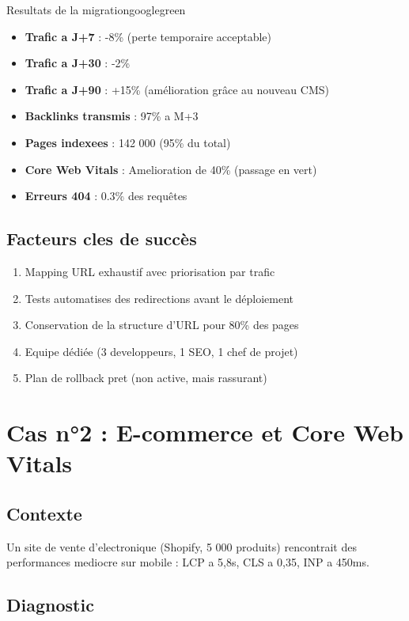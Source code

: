 \begin{mybox}{Resultats de la migration}{googlegreen}
\begin{itemize}
    \item \textbf{Trafic a J+7} : -8\% (perte temporaire acceptable)
    \item \textbf{Trafic a J+30} : -2\%
    \item \textbf{Trafic a J+90} : +15\% (amélioration grâce au nouveau CMS)
    \item \textbf{Backlinks transmis} : 97\% a M+3
    \item \textbf{Pages indexees} : 142 000 (95\% du total)
    \item \textbf{Core Web Vitals} : Amelioration de 40\% (passage en vert)
    \item \textbf{Erreurs 404} : 0.3\% des requêtes
\end{itemize}
\end{mybox}

\subsection{Facteurs cles de succès}

\begin{enumerate}
    \item Mapping URL exhaustif avec priorisation par trafic
    \item Tests automatises des redirections avant le déploiement
    \item Conservation de la structure d'URL pour 80\% des pages
    \item Equipe dédiée (3 developpeurs, 1 SEO, 1 chef de projet)
    \item Plan de rollback pret (non active, mais rassurant)
\end{enumerate}

\section{Cas n°2 : E-commerce et Core Web Vitals}

\subsection{Contexte}

Un site de vente d'electronique (Shopify, 5 000 produits) rencontrait des performances mediocre sur mobile : LCP a 5,8s, CLS a 0,35, INP a 450ms.

\subsection{Diagnostic}

